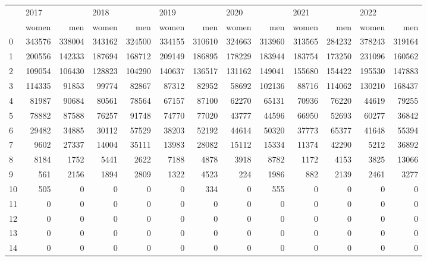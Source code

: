 \begin{tabular}{lrrrrrrrrrrrr}
\toprule
{} & \multicolumn{2}{l}{2017} & \multicolumn{2}{l}{2018} & \multicolumn{2}{l}{2019} & \multicolumn{2}{l}{2020} & \multicolumn{2}{l}{2021} & \multicolumn{2}{l}{2022} \\
{} &   women &     men &   women &     men &   women &     men &   women &     men &   women &     men &   women &     men \\
\midrule
0  &  343576 &  338004 &  343162 &  324500 &  334155 &  310610 &  324663 &  313960 &  313565 &  284232 &  378243 &  319164 \\
1  &  200556 &  142333 &  187694 &  168712 &  209149 &  186895 &  178229 &  183944 &  183754 &  173250 &  231096 &  160562 \\
2  &  109054 &  106430 &  128823 &  104290 &  140637 &  136517 &  131162 &  149041 &  155680 &  154422 &  195530 &  147883 \\
3  &  114335 &   91853 &   99774 &   82867 &   87312 &   82952 &   58692 &  102136 &   88716 &  114062 &  130210 &  168437 \\
4  &   81987 &   90684 &   80561 &   78564 &   67157 &   87100 &   62270 &   65131 &   70936 &   76220 &   44619 &   79255 \\
5  &   78882 &   87588 &   76257 &   91748 &   74770 &   77020 &   43777 &   44596 &   66950 &   52693 &   60277 &   36842 \\
6  &   29482 &   34885 &   30112 &   57529 &   38203 &   52192 &   44614 &   50320 &   37773 &   65377 &   41648 &   55394 \\
7  &    9602 &   27337 &   14004 &   35111 &   13983 &   28082 &   15112 &   15334 &   11374 &   42290 &    5212 &   36892 \\
8  &    8184 &    1752 &    5441 &    2622 &    7188 &    4878 &    3918 &    8782 &    1172 &    4153 &    3825 &   13066 \\
9  &     561 &    2156 &    1894 &    2809 &    1322 &    4523 &     224 &    1986 &     882 &    2139 &    2461 &    3277 \\
10 &     505 &       0 &       0 &       0 &       0 &     334 &       0 &     555 &       0 &       0 &       0 &       0 \\
11 &       0 &       0 &       0 &       0 &       0 &       0 &       0 &       0 &       0 &       0 &       0 &       0 \\
12 &       0 &       0 &       0 &       0 &       0 &       0 &       0 &       0 &       0 &       0 &       0 &       0 \\
13 &       0 &       0 &       0 &       0 &       0 &       0 &       0 &       0 &       0 &       0 &       0 &       0 \\
14 &       0 &       0 &       0 &       0 &       0 &       0 &       0 &       0 &       0 &       0 &       0 &       0 \\
\bottomrule
\end{tabular}
